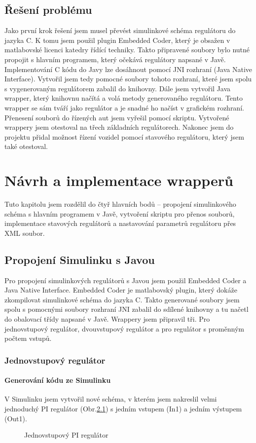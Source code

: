 \documentclass[thesis=M,czech,hidelinks]{FITthesis}[2012/06/26]
\begin{document}
\section{Řešení problému}
Jako první krok řešení jsem musel převést simulinkové schéma regulátoru do jazyka C. K tomu jsem použil plugin Embedded Coder\cite{coder}, který je obsažen v  matlabovské licenci katedry řídící techniky. Takto připravené soubory bylo nutné propojit s hlavním programem, který očekává regulátory napsané v Javě. Implementování C kódu do Javy lze dosáhnout pomocí JNI rozhraní (Java Native Interface)\cite{jni}. Vytvořil jsem tedy pomocné soubory tohoto rozhraní, které jsem spolu s vygenerovaným regulátorem zabalil do knihovny. Dále jsem vytvořil Java wrapper, který knihovnu načítá a volá metody generovaného regulátoru. Tento wrapper se sám tváří jako regulátor a je snadné ho načíst v grafickém rozhraní. Přenesení souborů do řízených aut jsem vyřešil pomocí skriptu. Vytvořené wrappery jsem otestoval na třech základních regulátorech. Nakonec jsem do projektu přidal možnost řízení vozidel pomocí stavového regulátoru, který jsem také otestoval. 


\chapter{Návrh a implementace wrapperů}
Tuto kapitolu jsem rozdělil do čtyř hlavních bodů – propojení simulinkového schéma s hlavním programem v Javě, vytvoření skriptu pro přenos souborů, implementace stavových regulátorů a nastavování parametrů regulátoru přes XML soubor.

\section{Propojení Simulinku s Javou}
Pro propojení simulinkových regulátorů s Javou jsem použil Embedded Coder a Java Native Interface. Embedded Coder je matlabovský plugin, který dokáže zkompilovat simulinkové schéma do jazyka C. Takto generované soubory jsem spolu s pomocnými soubory rozhraní JNI zabalil do sdílené knihovny a tu načetl do obalovací třídy napsané v Javě. Wrappery jsem připravil tři. Pro jednovstupový regulátor, dvouvstupový regulátor a pro regulátor s proměnným počtem vstupů. 
\subsection{Jednovstupový regulátor}
\subsubsection*{Generování kódu ze Simulinku}
V Simulinku jsem vytvořil nové schéma, v kterém jsem nakreslil 
velmi jednoduchý PI regulátor (Obr.\ref{fig:1reg}) s jedním vstupem (In1) a jedním výstupem (Out1).
\begin{figure}[h]
        \centering
        \caption{Jednovstupový PI regulátor}
        \label{fig:1reg}
\end{figure}
\end{document}
